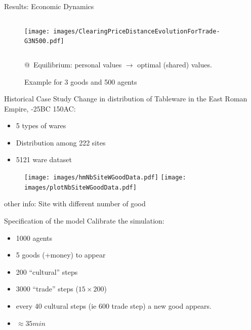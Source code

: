 \documentclass[12pt, notes=show]{beamer}
\begin{document}
\begin{frame}{Results: Economic Dynamics}
	\begin{figure}
	    \caption{Example for 3 goods and 500 agents}
	    \begin{columns}
		\texttt{[image: images/ClearingPriceDistanceEvolutionForTrade-G3N500.pdf]}\\
	    \end{columns}
		@~Equilibrium: personal values  $\rightarrow$ optimal (shared) values.
	\end{figure}
	
\end{frame}

\begin{frame}{Historical Case Study}
    \footnotesize
    \vspace{.5cm}
Change in distribution of Tableware in the East Roman Empire, -25BC 150AC:
    \begin{itemize}
	\item 5 types of wares 
	\item Distribution among 222 sites
	\item 5121 ware dataset
 \end{itemize}

 \begin{figure}
     \texttt{[image: images/hmNbSiteWGoodData.pdf]}
     \texttt{[image: images/plotNbSiteWGoodData.pdf]}
     
 \end{figure}
 \begin{center}
     \tiny other info: Site with different number of good
 \end{center}
\end{frame}

\begin{frame}{Specification of the model}
    Calibrate the simulation:
    \begin{itemize}
	\item 1000 agents
	\item 5 goods (+money) to appear 
	\item 200 ``cultural'' steps 
	\item 3000 ``trade'' steps ($15\times200$)
	\item every 40 cultural steps (ie $600$ trade step) a new good appears.
	\item $\approx 35min$
    \end{itemize}
\end{frame}
\end{document}
